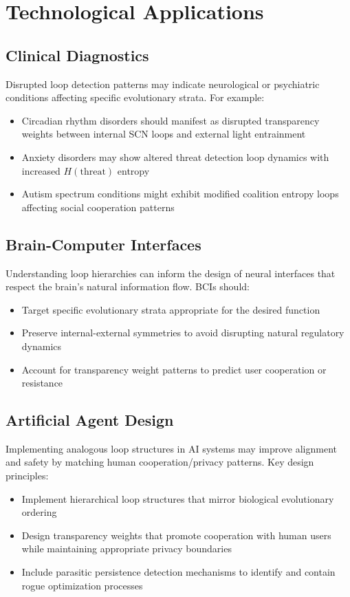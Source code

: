 \documentclass[10pt,conference]{IEEEtran}
\begin{document}
\section{Technological Applications}

\subsection{Clinical Diagnostics}
Disrupted loop detection patterns may indicate neurological or psychiatric conditions affecting specific evolutionary strata. For example:
\begin{itemize}
\item Circadian rhythm disorders should manifest as disrupted transparency weights between internal SCN loops and external light entrainment
\item Anxiety disorders may show altered threat detection loop dynamics with increased $H(\mathrm{threat})$ entropy
\item Autism spectrum conditions might exhibit modified coalition entropy loops affecting social cooperation patterns
\end{itemize}

\subsection{Brain-Computer Interfaces}
Understanding loop hierarchies can inform the design of neural interfaces that respect the brain's natural information flow. BCIs should:
\begin{itemize}
\item Target specific evolutionary strata appropriate for the desired function
\item Preserve internal-external symmetries to avoid disrupting natural regulatory dynamics
\item Account for transparency weight patterns to predict user cooperation or resistance
\end{itemize}

\subsection{Artificial Agent Design}
Implementing analogous loop structures in AI systems may improve alignment and safety by matching human cooperation/privacy patterns. Key design principles:
\begin{itemize}
\item Implement hierarchical loop structures that mirror biological evolutionary ordering
\item Design transparency weights that promote cooperation with human users while maintaining appropriate privacy boundaries
\item Include parasitic persistence detection mechanisms to identify and contain rogue optimization processes
\end{itemize}
\end{document}
